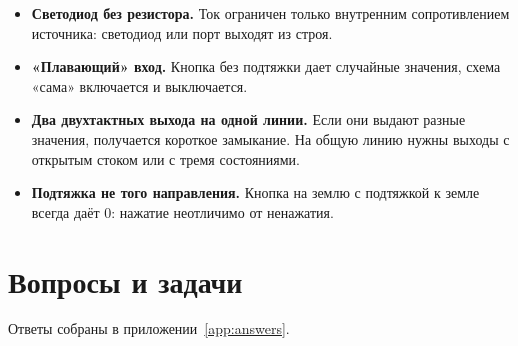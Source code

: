 \begin{warnbox}
\begin{itemize}
  \item \textbf{Светодиод без резистора.} Ток ограничен только внутренним
        сопротивлением источника: светодиод или порт выходят из строя.
  \item \textbf{«Плавающий» вход.} Кнопка без подтяжки дает случайные значения,
        схема «сама» включается и выключается.
  \item \textbf{Два двухтактных выхода на одной линии.} Если они выдают разные
        значения, получается короткое замыкание. На общую линию нужны выходы с
        открытым стоком или с тремя состояниями.
  \item \textbf{Подтяжка не того направления.} Кнопка на землю с подтяжкой к
        земле всегда даёт 0: нажатие неотличимо от ненажатия.
\end{itemize}
\end{warnbox}

\section{Вопросы и задачи}
\label{sec:tasks-electrical}

Ответы собраны в приложении~\ref{app:answers}.


